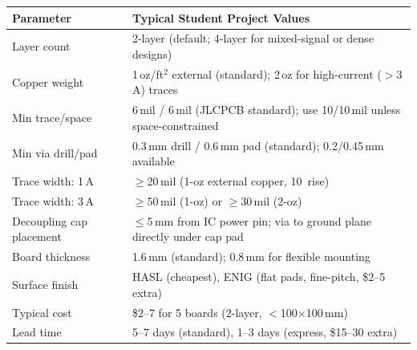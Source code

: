 \begin{quickrefbox}
\begin{table}[H]\centering\small
\begin{tabularx}{\linewidth}{l X}
\toprule
\textbf{Parameter} & \textbf{Typical Student Project Values} \\
\midrule
Layer count & 2-layer (default; 4-layer for mixed-signal or dense designs) \\
Copper weight & 1\,oz/ft$^2$ external (standard); 2\,oz for high-current ($>$3\,A) traces \\
Min trace/space & 6\,mil / 6\,mil (JLCPCB standard); use 10/10\,mil unless space-constrained \\
Min via drill/pad & 0.3\,mm drill / 0.6\,mm pad (standard); 0.2/0.45\,mm available \\
Trace width: 1\,A & $\geq$20\,mil (1-oz external copper, 10\,\degC{} rise) \\
Trace width: 3\,A & $\geq$50\,mil (1-oz) or $\geq$30\,mil (2-oz) \\
Decoupling cap placement & $\leq$5\,mm from IC power pin; via to ground plane directly under cap pad \\
Board thickness & 1.6\,mm (standard); 0.8\,mm for flexible mounting \\
Surface finish & HASL (cheapest), ENIG (flat pads, fine-pitch, \$2--5 extra) \\
Typical cost & \$2--7 for 5 boards (2-layer, $<$100$\times$100\,mm) \\
Lead time & 5--7 days (standard), 1--3 days (express, \$15--30 extra) \\
\bottomrule
\end{tabularx}
\end{table}
\end{quickrefbox}


